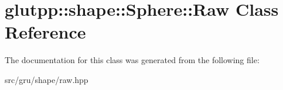 \hypertarget{classglutpp_1_1shape_1_1Sphere_1_1Raw}{\section{glutpp\-:\-:shape\-:\-:\-Sphere\-:\-:\-Raw \-Class \-Reference}
\label{classglutpp_1_1shape_1_1Sphere_1_1Raw}
}


\-The documentation for this class was generated from the following file\-:\begin{DoxyCompactItemize}
\item 
src/gru/shape/raw.\-hpp\end{DoxyCompactItemize}
